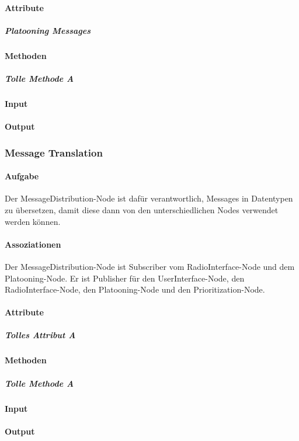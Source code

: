 \documentclass[a4paper, 12pt, titlepage]{scrartcl}
\begin{document}
				\paragraph{Attribute}
					\subparagraph{Platooning Messages}
				\paragraph{Methoden}
					\subparagraph{Tolle Methode A}
				\paragraph{Input}
				\paragraph{Output}
			
			\subsubsection{Message Translation}
			\label{message_translation}
				\paragraph{Aufgabe} Der MessageDistribution-Node ist dafür verantwortlich, Messages in Datentypen zu übersetzen, damit diese dann von den unterschiedlichen Nodes verwendet werden können. 
				\paragraph{Assoziationen} Der MessageDistribution-Node ist Subscriber vom RadioInterface-Node und dem Platooning-Node. Er ist Publisher für den UserInterface-Node, den RadioInterface-Node, den Platooning-Node und den Prioritization-Node. 
				\paragraph{Attribute}
					\subparagraph{Tolles Attribut A}
				\paragraph{Methoden}
					\subparagraph{Tolle Methode A}
				\paragraph{Input}
				\paragraph{Output}
\end{document}
